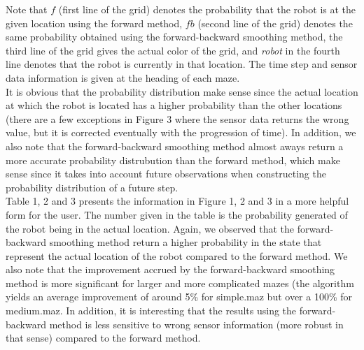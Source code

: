 \documentclass[9.5pt]{extarticle}
\begin{document}
Note that $f$ (first line of the grid) denotes the probability that the robot is at the given location using the forward method, $fb$ (second line of the grid) denotes the same probability obtained using the forward-backward smoothing method, the third line of the grid gives the actual color of the grid, and \textit{robot} in the fourth line denotes that the robot is currently in that location. The time step and sensor data information is given at the heading of each maze.\\

It is obvious that the probability distribution make sense since the actual location at which the robot is located has a higher probability than the other locations (there are a few exceptions in Figure 3 where the sensor data returns the wrong value, but it is corrected eventually with the progression of time). In addition, we also note that the forward-backward smoothing method almost aways return a more accurate probability distrubution than the forward method, which make sense since it takes into account future observations when constructing the probability distribution of a future step. \\

Table 1, 2 and 3 presents the information in Figure 1, 2 and 3 in a more helpful form for the user. The number given in the table is the probability generated of the robot being in the actual location. Again, we observed that the forward-backward smoothing method return a higher probability in the state that represent the actual location of the robot compared to the forward method. We also note that the improvement accrued by the forward-backward smoothing method is more significant for larger and more complicated mazes (the algorithm yields an average improvement of around 5\% for simple.maz but over a 100\% for medium.maz. In addition, it is interesting that the results using the forward-backward method is less sensitive to wrong sensor information (more robust in that sense) compared to the forward method.


\begin{table}[H]
\centering
\caption{Experiements performed to measure improvement in probability distribution using the forward-backward smoothing method for simple.maz (with all sensor data being correct). The number given is the probability generated of the robot being in the actual location}
\label{my-label}
\end{table}
\end{document}

